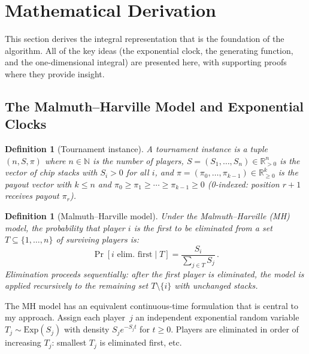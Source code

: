 \documentclass[11pt]{article}
\newtheorem{definition}[theorem]{Definition}
\begin{document}
\section{Mathematical Derivation}\label{sec:derivation}

This section derives the integral representation that is the foundation
of the algorithm. All of the key ideas (the exponential clock, the
generating function, and the one-dimensional integral) are presented
here, with supporting proofs where they provide insight.

\subsection{The Malmuth--Harville Model and Exponential Clocks}

\begin{definition}[Tournament instance]\label{def:tournament}
A \emph{tournament instance} is a tuple $(n, S, \pi)$ where
$n \in \mathbb{N}$ is the number of players, $S = (S_1, \ldots, S_n)
\in \mathbb{R}_{>0}^n$ is the vector of chip stacks with $S_i > 0$ for all
$i$, and $\pi = (\pi_0, \ldots, \pi_{k-1}) \in \mathbb{R}_{\geq 0}^k$
is the payout vector with $k \leq n$ and $\pi_0 \geq \pi_1 \geq \cdots
\geq \pi_{k-1} \geq 0$ (0-indexed: position $r+1$ receives payout $\pi_r$).
\end{definition}

\begin{definition}[Malmuth--Harville model]\label{def:mh}
Under the Malmuth--Harville (MH) model, the probability that player $i$ is
the first to be eliminated from a set $T \subseteq \{1, \ldots, n\}$ of
surviving players is:
\begin{equation}\label{eq:mh-elim}
  \Pr[i \text{ elim.\ first} \mid T] = \frac{S_i}{\sum_{j \in T} S_j}\,.
\end{equation}
Elimination proceeds sequentially: after the first player is eliminated, the
model is applied recursively to the remaining set $T \setminus \{i\}$ with
unchanged stacks.
\end{definition}

The MH model has an equivalent continuous-time formulation that is central
to my approach. Assign each player~$j$ an independent exponential random
variable $T_j \sim \mathrm{Exp}(S_j)$ with density $S_j e^{-S_j t}$ for
$t \geq 0$. Players are eliminated in order of increasing $T_j$: smallest
$T_j$ is eliminated first, etc.
\end{document}
